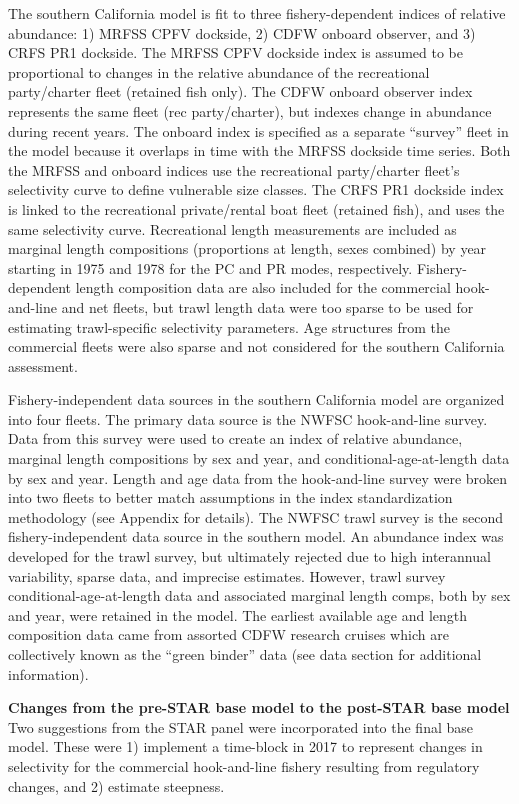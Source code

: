 \documentclass[11pt,
  english,
]{article}
\begin{document}
The southern California model is fit to three fishery-dependent indices of relative abundance: 1) MRFSS CPFV dockside, 2) CDFW onboard observer, and 3) CRFS PR1 dockside. The MRFSS CPFV dockside index is assumed to be proportional to changes in the relative abundance of the recreational party/charter fleet (retained fish only). The CDFW onboard observer index represents the same fleet (rec party/charter), but indexes change in abundance during recent years. The onboard index is specified as a separate ``survey'' fleet in the model because it overlaps in time with the MRFSS dockside time series. Both the MRFSS and onboard indices use the recreational party/charter fleet's selectivity curve to define vulnerable size classes. The CRFS PR1 dockside index is linked to the recreational private/rental boat fleet (retained fish), and uses the same selectivity curve. Recreational length measurements are included as marginal length compositions (proportions at length, sexes combined) by year starting in 1975 and 1978 for the PC and PR modes, respectively. Fishery-dependent length composition data are also included for the commercial hook-and-line and net fleets, but trawl length data were too sparse to be used for estimating trawl-specific selectivity parameters. Age structures from the commercial fleets were also sparse and not considered for the southern California assessment.

Fishery-independent data sources in the southern California model are organized into four fleets. The primary data source is the NWFSC hook-and-line survey. Data from this survey were used to create an index of relative abundance, marginal length compositions by sex and year, and conditional-age-at-length data by sex and year. Length and age data from the hook-and-line survey were broken into two fleets to better match assumptions in the index standardization methodology (see Appendix for details). The NWFSC trawl survey is the second fishery-independent data source in the southern model. An abundance index was developed for the trawl survey, but ultimately rejected due to high interannual variability, sparse data, and imprecise estimates. However, trawl survey conditional-age-at-length data and associated marginal length comps, both by sex and year, were retained in the model. The earliest available age and length composition data came from assorted CDFW research cruises which are collectively known as the ``green binder'' data (see data section for additional information).

\textbf{Changes from the pre-STAR base model to the post-STAR base model} Two suggestions from the STAR panel were incorporated into the final base model. These were 1) implement a time-block in 2017 to represent changes in selectivity for the commercial hook-and-line fishery resulting from regulatory changes, and 2) estimate steepness.
\end{document}
